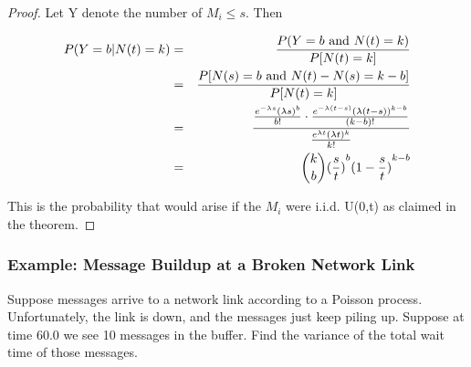 \begin{proof}

Let Y denote the number of $M_i \leq s$.  Then 

\begin{eqnarray}
P(Y = b | N(t) = k) &=& 
\frac
{P(Y = b ~{\rm and}~ N(t) = k)}
{P[N(t) = k]} \\ 
&=& 
\frac
{P[N(s) = b ~{\rm and}~ N(t)-N(s) = k-b]}
{P[N(t) = k]} \\ 
&=&
\frac
{
   {\frac{e^{-\lambda s}(\lambda s)^b}{b!}} \cdot
   {\frac{e^{-\lambda (t-s)} (\lambda (t-s))^{k-b}}{(k-b)!}}
}
{
   \frac
      {e^{\lambda t} (\lambda t)^k}
      {k!}
} \\
&=& \binom{k}{b} {(\frac{s}{t})}^b {(1-\frac{s}{t})}^{k-b}
\end{eqnarray}

This is the probability that would arise if the $M_i$ were i.i.d. U(0,t)
as claimed in the theorem.

% 
% 

\end{proof}

\subsubsection{Example:  Message Buildup at a Broken Network Link}

Suppose messages arrive to a network link according to a Poisson
process. Unfortunately, the link is down, and the messages just keep
piling up. Suppose at time 60.0 we see 10 messages in the buffer. Find
the variance of the total wait time of those messages.

